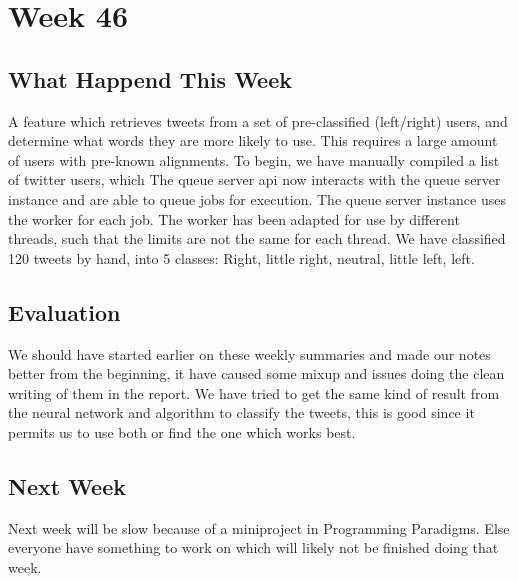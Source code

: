 \section*{Week 46}
\subsection*{What Happend This Week}
A feature which retrieves tweets from a set of pre-classified (left/right)
users, and determine what words they are more likely to use. This requires a
large amount of users with pre-known alignments. To begin, we have manually
compiled a list of twitter users, which
The queue server api now interacts with the queue server instance and are able
to queue jobs for execution. The queue server instance uses the worker for each
job. The worker has been adapted for use by different threads, such that the
limits are not the same for each thread.
We have classified 120 tweets by hand, into 5 classes: Right, little right,
neutral, little left, left. 


\subsection*{Evaluation}
We should have started earlier on these weekly summaries and made our notes
better from the beginning, it have caused some mixup and issues doing the clean
writing of them in the report. We have tried to get the same kind of result from
the neural network and algorithm to classify the tweets, this is good since it
permits us to use both or find the one which works best.


\subsection*{Next Week}
Next week will be slow because of a miniproject in Programming Paradigms. Else
everyone have something to work on which will likely not be finished doing that
week.



